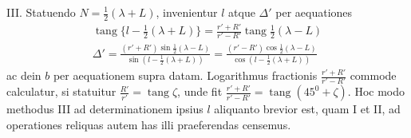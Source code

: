 III. Statuendo $N=\frac12(\lambda+L)$, invenientur $l$ atque $\Delta'$ per aequationes
\[
\begin{gathered}
\operatorname{tang}\{l-\tfrac12(\lambda+L)\}=\frac{r'+R'}{r'-R'}\operatorname{tang}\tfrac12(\lambda-L)\\[.5em]
\Delta'=\frac{(r'+R')\sin\frac12(\lambda-L)}{\sin(l-\frac12(\lambda+L))}=\frac{(r'-R')\cos\frac12(\lambda-L)}{\cos(l-\frac12(\lambda+L))}
\end{gathered}
\]
ac dein $b$ per aequationem supra datam. Logarithmus fractionis $\frac{r'+R'}{r'-R'}$ commode calculatur, si statuitur $\frac{R'}{r'}=\operatorname{tang}\zeta$, unde fit $\frac{r'+R'}{r'-R'}=\operatorname{tang}(45^0+\zeta)$. Hoc modo methodus III ad determinationem ipsius $l$ aliquanto brevior est, quam I et II, ad operationes reliquas autem has illi praeferendas censemus.
